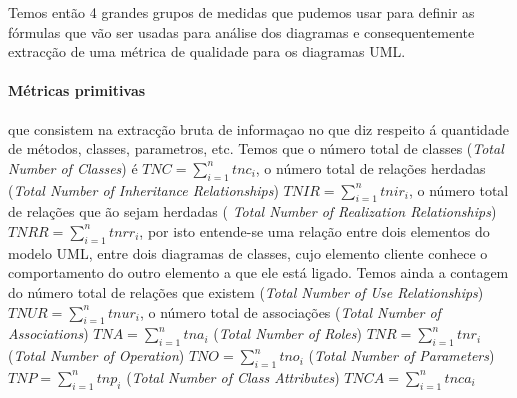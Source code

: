 Temos então 4 grandes grupos de medidas que pudemos usar para definir as fórmulas que vão ser usadas para análise dos diagramas e consequentemente extracção de uma métrica
de qualidade para os diagramas UML.
\paragraph{Métricas primitivas} que consistem na extracção bruta de informaçao no que diz respeito á quantidade de métodos, classes, parametros, etc.
Temos que o número total de classes (\textit{Total Number of Classes}) é $TNC = \sum_{i=1}^{n} tnc_i $,
o número total de relações herdadas (\textit{Total Number of Inheritance Relationships})  $TNIR = \sum_{i=1}^{n} tnir_i $,
o número total de relações que ão sejam herdadas (\textit{ Total Number of Realization Relationships})  $TNRR = \sum_{i=1}^{n} tnrr_i $, por isto entende-se
uma relação entre dois elementos do modelo UML, entre dois diagramas de classes, cujo elemento cliente conhece o comportamento do outro elemento a que ele está ligado.
Temos ainda a contagem do número total de relações que existem (\textit{Total Number of Use Relationships})  $TNUR = \sum_{i=1}^{n} tnur_i $,
o número total de associações (\textit{Total Number of Associations})    $TNA = \sum_{i=1}^{n} tna_i $
(\textit{Total Number of Roles})   $TNR = \sum_{i=1}^{n} tnr_i $
(\textit{Total Number of Operation})   $TNO = \sum_{i=1}^{n} tno_i $
(\textit{Total Number of Parameters})  $TNP = \sum_{i=1}^{n} tnp_i $
(\textit{Total Number of Class Attributes})  $TNCA = \sum_{i=1}^{n} tnca_i $


